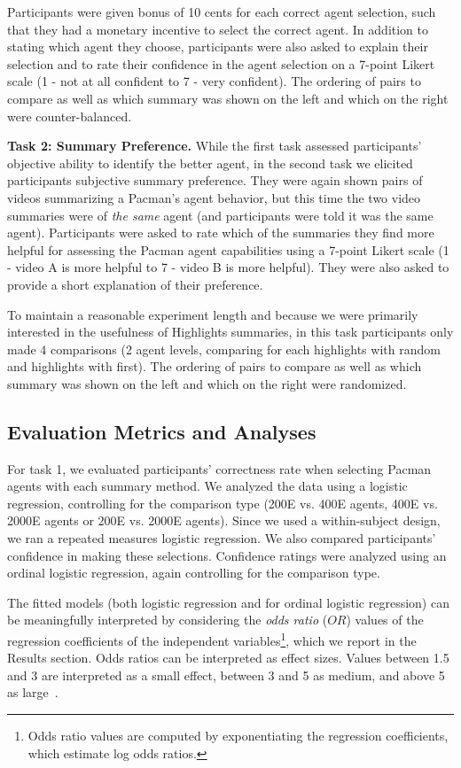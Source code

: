Participants were given bonus of 10 cents for each correct agent selection, such that they had a monetary incentive to select the correct agent. In addition to stating which agent they choose, participants were also asked to explain their selection and to rate their confidence in the agent selection on a 7-point Likert scale (1 - not at all confident to 7 - very confident). The ordering of pairs to compare as well as which summary was shown on the left and which on the right were counter-balanced. 

\textbf{Task 2: Summary Preference.}
While the first task assessed participants' objective ability to identify the better agent, in the second task we elicited participants subjective summary preference. They were again shown pairs of videos summarizing a Pacman's agent behavior, but this time the two video summaries were of \emph{the same} agent (and participants were told it was the same agent). Participants were asked to rate which of the summaries they find more helpful for assessing the Pacman agent capabilities using a 7-point Likert scale (1 - video A is more helpful to 7 - video B is more helpful). They were also asked to provide a short explanation of their preference. 

To maintain a reasonable experiment length and because we were primarily interested in the usefulness of Highlights summaries, in this task participants only made 4 comparisons (2 agent levels, comparing for each highlights with random and highlights with first). The ordering of pairs to compare as well as which summary was shown on the left and which on the right were randomized. 

\subsection{Evaluation Metrics and Analyses}
For task 1, we evaluated participants' correctness rate when selecting Pacman agents with each summary method. We analyzed the data using a logistic regression, controlling for the comparison type (200E vs. 400E agents, 400E vs. 2000E agents or 200E vs. 2000E agents). Since we used a within-subject design, we ran a repeated measures logistic regression. We also compared participants' confidence in making these selections. Confidence ratings were analyzed using an ordinal logistic regression, again controlling for the comparison type. 

The fitted models (both logistic regression and for ordinal logistic regression) can be meaningfully interpreted by considering the \emph{odds ratio} ($OR$) values of the regression coefficients of the independent variables\footnote{Odds ratio values are computed by exponentiating the regression coefficients, which estimate log odds ratios.}, which we report in the Results section. Odds ratios can be interpreted as effect sizes. Values between 1.5 and 3 are interpreted as a small effect, between 3 and 5 as medium, and above 5 as large~\cite{borenstein2009converting,chen2010big}.

